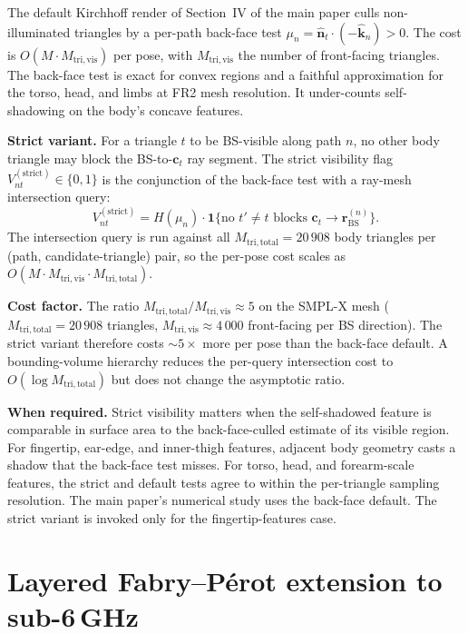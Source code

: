 \documentclass[10pt,journal,twocolumn]{IEEEtran}
\newcommand{\nhat}{\hat{\bm{n}}}
\newcommand{\khat}{\hat{\bm{k}}}
\theoremstyle{plain}
\theoremstyle{definition}
\begin{document}
The default Kirchhoff render of Section~IV of the main paper culls
non-illuminated triangles by a per-path back-face test
$\mu_n = \nhat_t \cdot (-\khat_n) > 0$. The cost is
$O(M \cdot M_\mathrm{tri,vis})$ per pose, with $M_\mathrm{tri,vis}$
the number of front-facing triangles. The back-face test is exact
for convex regions and a faithful approximation for the torso, head,
and limbs at FR2 mesh resolution. It under-counts self-shadowing on
the body's concave features.

\textbf{Strict variant.} For a triangle $t$ to be BS-visible along
path $n$, no other body triangle may block the BS-to-$\bm{c}_t$ ray
segment. The strict visibility flag
$V^{(\mathrm{strict})}_{nt} \in \{0, 1\}$ is the conjunction of the
back-face test with a ray-mesh intersection query:
\begin{equation}\label{eq:V-strict}
  V^{(\mathrm{strict})}_{nt} = H(\mu_n) \cdot
    \mathbf{1}\bigl\{\text{no $t' \neq t$ blocks
      $\bm{c}_t \to \bm{r}_\mathrm{BS}^{(n)}$}\bigr\}.
\end{equation}
The intersection query is run against all $M_\mathrm{tri,total} =
20\,908$ body triangles per (path, candidate-triangle) pair, so the
per-pose cost scales as
$O(M \cdot M_\mathrm{tri,vis} \cdot M_\mathrm{tri,total})$.

\textbf{Cost factor.} The ratio
$M_\mathrm{tri,total} / M_\mathrm{tri,vis} \approx 5$ on the SMPL-X
mesh ($M_\mathrm{tri,total} = 20\,908$ triangles,
$M_\mathrm{tri,vis} \approx 4\,000$ front-facing per BS direction).
The strict variant therefore costs ${\sim}5{\times}$ more per pose
than the back-face default. A bounding-volume hierarchy reduces the
per-query intersection cost to $O(\log M_\mathrm{tri,total})$ but
does not change the asymptotic ratio.

\textbf{When required.} Strict visibility matters when the
self-shadowed feature is comparable in surface area to the
back-face-culled estimate of its visible region. For fingertip,
ear-edge, and inner-thigh features, adjacent body geometry casts a
shadow that the back-face test misses. For torso, head, and
forearm-scale features, the strict and default tests agree to within
the per-triangle sampling resolution. The main paper's numerical
study uses the back-face default. The strict variant is invoked
only for the fingertip-features case.

\section{Layered Fabry--P\'{e}rot extension to sub-6\,GHz}\label{si:fp}
\end{document}
